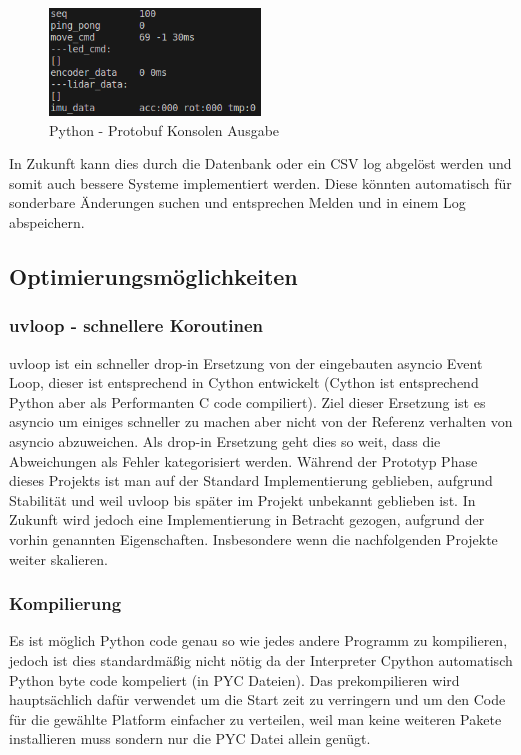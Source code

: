 \begin{figure}[H]
    \includegraphics[width=0.5\textwidth, center]{img/Backend/print_wrapper_all.png}
    \caption{Python - Protobuf Konsolen Ausgabe}
    \label{fig:py_konsole_o}
\end{figure}

In Zukunft kann dies durch die Datenbank oder ein CSV log abgelöst werden 
und somit auch bessere Systeme implementiert werden.
% 
Diese könnten automatisch für sonderbare Änderungen suchen 
und entsprechen Melden und in einem Log abspeichern.

\subsection{Optimierungsmöglichkeiten}
\label{subsec:Optimierungsmöglichkeiten}
\subsubsection{uvloop - schnellere Koroutinen}
uvloop ist ein schneller drop-in Ersetzung von der eingebauten asyncio Event Loop, 
dieser ist entsprechend in Cython entwickelt 
(Cython ist entsprechend Python aber als Performanten C code compiliert).
Ziel dieser Ersetzung ist es asyncio um einiges schneller zu machen 
aber nicht von der Referenz verhalten von asyncio abzuweichen. 
Als drop-in Ersetzung geht dies so weit, 
dass die Abweichungen als Fehler kategorisiert werden.
% 
Während der Prototyp Phase dieses Projekts 
ist man auf der Standard Implementierung geblieben, aufgrund Stabilität
und weil uvloop bis später im Projekt unbekannt geblieben ist.
In Zukunft wird jedoch eine Implementierung in Betracht gezogen,
aufgrund der vorhin genannten Eigenschaften.
% 
Insbesondere wenn die nachfolgenden Projekte weiter skalieren.

\subsubsection{Kompilierung}
Es ist möglich Python code genau so wie jedes andere Programm zu kompilieren,
jedoch ist dies standardmäßig nicht nötig 
da der Interpreter Cpython automatisch Python byte code kompeliert (in PYC Dateien).
Das prekompilieren wird hauptsächlich dafür verwendet um die Start zeit zu verringern 
und um den Code für die gewählte Platform einfacher zu verteilen,
weil man keine weiteren Pakete installieren muss sondern
nur die PYC Datei allein genügt.

